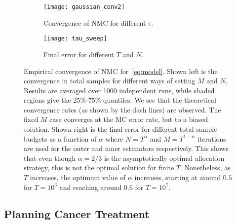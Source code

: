 \begin{figure}[t]
	\centering
	\begin{subfigure}[b]{0.49\textwidth}
		\centering
	\texttt{[image: gaussian\_conv2]}
	\caption{Convergence of NMC for different $\tau$. \label{fig:emprical-conv}}
	\end{subfigure}
	\begin{subfigure}[b]{0.49\textwidth}
		\centering
	\texttt{[image: tau\_sweep]}
		\caption{Final error for different $T$ and $N$.\label{fig:tau_sweep}}
	\end{subfigure}
	\caption{Empirical convergence of NMC for~\eqref{eq:model}.  Shown left is the
		convergence in total samples for different ways of setting $M$ and $N$.  
		Results are averaged over 1000 independent runs, while shaded regions give the 25\%-75\% quantiles. We
		see that the theoretical convergence rates (as shown by the dash lines) are observed. 
		The fixed $M$ case converges at the MC error rate, but to a biased solution.
		Shown right is the final error for different total sample budgets
		as a function of $\alpha$ where $N=T^{\alpha}$ and $M=T^{1-\alpha}$ iterations are used for the outer
		and inner estimators respectively.  This shows that even though $\alpha=2/3$ is the
		asymptotically optimal allocation strategy, this is not the optimal solution for
		finite $T$. Nonetheless, as $T$ increases, the optimum value of $\alpha$ increases,
		starting at around $0.5$ for $T=10^3$ and reaching around $0.6$ for $T=10^7$. \vspace{-5pt}}
\end{figure}	



\subsection{Planning Cancer Treatment}
\label{sec:cancer}

